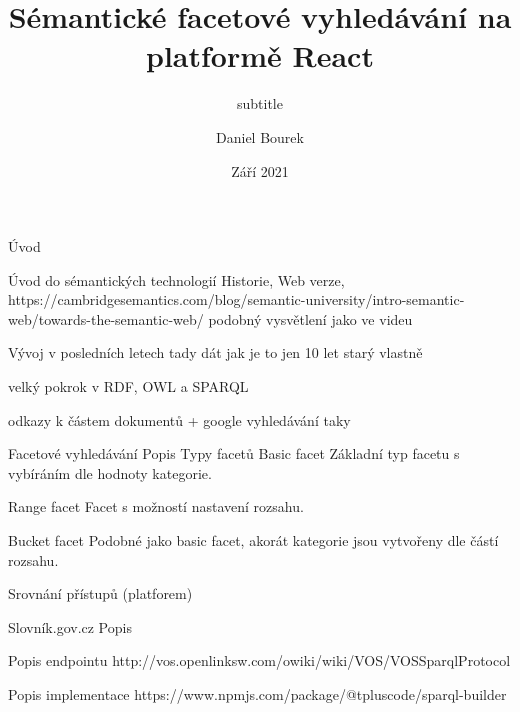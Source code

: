 

\worktype [O/CZ]

\title {Sémantické facetové vyhledávání na platformě React}
\subtitle {subtitle}

\author {Daniel Bourek}
\date {Září 2021}




\makefront

\chap Úvod

\chap Úvod do sémantických technologií
	\sec Historie, Web verze,
	https://cambridgesemantics.com/blog/semantic-university/intro-semantic-web/towards-the-semantic-web/ podobný vysvětlení jako ve videu

	\sec Vývoj v posledních letech
	tady dát jak je to jen 10 let starý vlastně

	velký pokrok v RDF, OWL a SPARQL

	odkazy k částem dokumentů + google vyhledávání taky

\chap Facetové vyhledávání
	\sec Popis
	\sec Typy facetů
		\secc Basic facet
		Základní typ facetu s vybíráním dle hodnoty kategorie.

		\secc Range facet
		Facet s možností nastavení rozsahu.

		\secc Bucket facet
		Podobné jako basic facet, akorát kategorie jsou vytvořeny dle částí rozsahu.
		
	\sec Srovnání přístupů (platforem)

\chap Slovník.gov.cz
	\sec Popis

	\sec Popis endpointu
	http://vos.openlinksw.com/owiki/wiki/VOS/VOSSparqlProtocol

\chap Popis implementace
https://www.npmjs.com/package/@tpluscode/sparql-builder

\bye